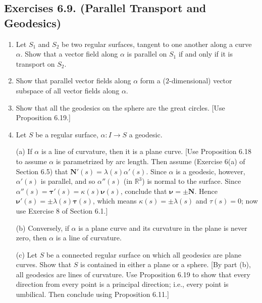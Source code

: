 \documentclass[leqno]{book}
\begin{document}
\subsection*{Exercises 6.9. (Parallel Transport and Geodesics)} %
\begin{enumerate}
\item Let $S_1$ and $S_2$ be two regular surfaces, tangent to one another along a curve $\alpha$.  Show that a vector field along $\alpha$ is parallel on $S_1$ if and only if it is transport on $S_2$.

\item Show that parallel vector fields along $\alpha$ form a ($2$-dimensional) vector subspace of all vector fields along $\alpha$.

\item Show that all the geodesics on the sphere are the great circles.  [Use Proposition 6.19.]

\item Let $S$ be a regular surface, $\alpha:I\to S$ a geodesic.

(a) If $\alpha$ is a line of curvature, then it is a plane curve.  [Use Proposition 6.18 to assume $\alpha$ is parametrized by arc length.  Then assume (Exercise 6(a) of Section 6.5) that $\mathbf N'(s)=\lambda(s)\alpha'(s)$.  Since $\alpha$ is a geodesic, however, $\alpha'(s)$ is parallel, and so $\alpha''(s)$ (in $\mathbb R^3$) is normal to the surface.  Since $\alpha''(s)=\boldsymbol\tau'(s)=\kappa(s)\boldsymbol\nu(s)$, conclude that $\boldsymbol\nu=\pm\mathbf N$.  Hence $\boldsymbol\nu'(s)=\pm\lambda(s)\boldsymbol\tau(s)$, which means $\kappa(s)=\pm\lambda(s)$ and $\tau(s)=0$; now use Exercise 8 of Section 6.1.]

(b) Conversely, if $\alpha$ is a plane curve and its curvature in the plane is never zero, then $\alpha$ is a line of curvature.

(c) Let $S$ be a connected regular surface on which all geodesics are plane curves.  Show that $S$ is contained in either a plane or a sphere.  [By part (b), all geodesics are lines of curvature.  Use Proposition 6.19 to show that every direction from every point is a principal direction; i.e., every point is umbilical.  Then conclude using Proposition 6.11.]


\end{enumerate}
\end{document}
